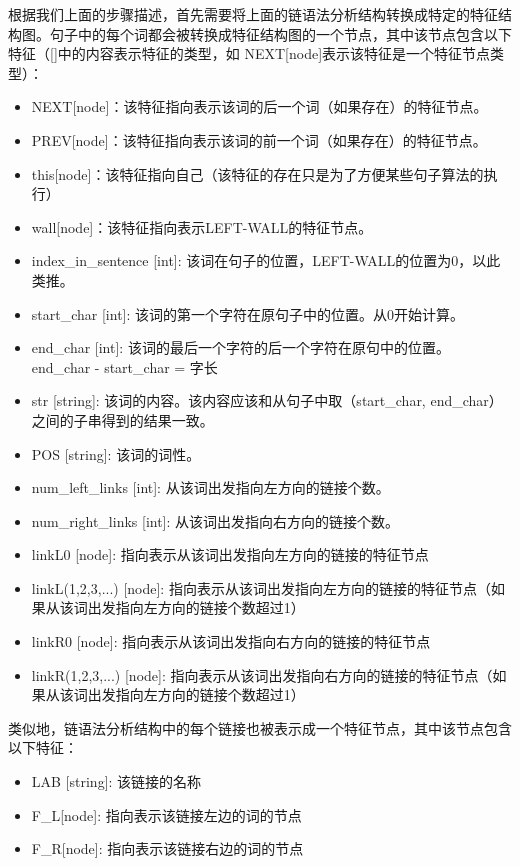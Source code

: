 根据我们上面的步骤描述，首先需要将上面的链语法分析结构转换成特定的特征结构图。句子中的每个词都会被转换成特征结构图的一个节点，其中该节点包含以下特征（[]中的内容表示特征的类型，如 NEXT[node]表示该特征是一个特征节点类型）：

\begin{itemize}
\item NEXT[node]：该特征指向表示该词的后一个词（如果存在）的特征节点。
\item PREV[node]：该特征指向表示该词的前一个词（如果存在）的特征节点。
\item this[node]：该特征指向自己（该特征的存在只是为了方便某些句子算法的执行）
\item wall[node]：该特征指向表示LEFT-WALL的特征节点。
\item index\_in\_sentence [int]: 该词在句子的位置，LEFT-WALL的位置为0，以此类推。
\item start\_char [int]: 该词的第一个字符在原句子中的位置。从0开始计算。
\item end\_char [int]: 该词的最后一个字符的后一个字符在原句中的位置。 end\_char - start\_char = 字长
\item str [string]: 该词的内容。该内容应该和从句子中取（start\_char, end\_char）之间的子串得到的结果一致。
\item POS [string]: 该词的词性。
\item num\_left\_links [int]: 从该词出发指向左方向的链接个数。
\item num\_right\_links [int]: 从该词出发指向右方向的链接个数。
\item linkL0 [node]: 指向表示从该词出发指向左方向的链接的特征节点
\item linkL(1,2,3,...) [node]: 指向表示从该词出发指向左方向的链接的特征节点（如果从该词出发指向左方向的链接个数超过1）
\item linkR0 [node]: 指向表示从该词出发指向右方向的链接的特征节点
\item linkR(1,2,3,...) [node]: 指向表示从该词出发指向右方向的链接的特征节点（如果从该词出发指向左方向的链接个数超过1）
\end{itemize}

类似地，链语法分析结构中的每个链接也被表示成一个特征节点，其中该节点包含以下特征：

\begin{itemize}
\item LAB [string]: 该链接的名称
\item F\_L[node]: 指向表示该链接左边的词的节点
\item F\_R[node]: 指向表示该链接右边的词的节点
\end{itemize}

